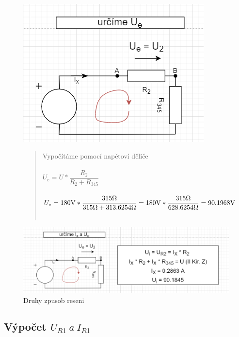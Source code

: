\begin{figure}[H]
    \centering
    \includegraphics[scale=0.5]{picturesFor2Uloha/4.png}
    \begin{quote}
        \centering
	    Vypočítáme pomocí napětoví děliče \\~\\ 
	    $U_e = U * \dfrac{R_2}{R_2 + R_{345}} $ \\~\\
	    $U_e = 180\Vo * \dfrac{315\Omega}{315\Omega + 313.6254\Omega}  = 
	    180\Vo * \dfrac{315\Omega}{628.6254\Omega} = 90.1968\Vo$ \\~\\
	   
    \end{quote}
\end{figure}
\begin{figure}[H]
    \centering
    \includegraphics[scale=0.5]{picturesFor2Uloha/4_druhy_zpusob.png}
    \caption{Druhy zpusob reseni}
\end{figure}

\subsection{Výpočet $U_{R1} \: a \: I_{R1}$}

